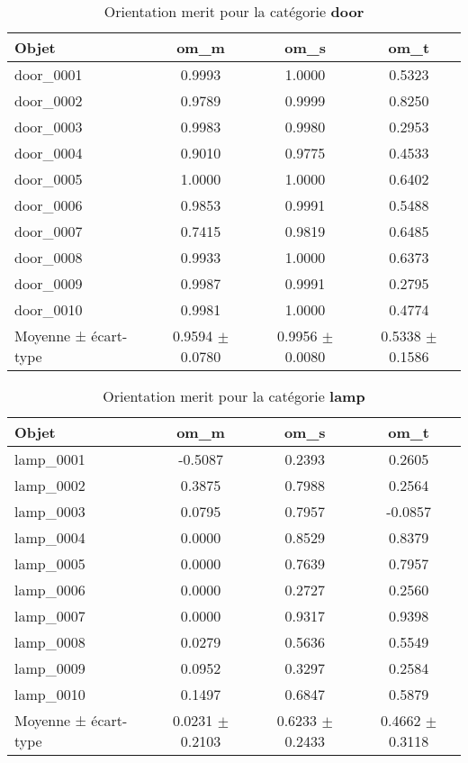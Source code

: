 \documentclass[a4paper,11pt]{article}
\begin{document}
\begin{table}[h!]
\centering
\caption{Orientation merit pour la catégorie \textbf{door}}
\begin{tabular}{lccc}
\toprule
Objet & om\_m & om\_s & om\_t \\
\midrule
door\_0001 & 0.9993 & 1.0000 & 0.5323 \\
door\_0002 & 0.9789 & 0.9999 & 0.8250 \\
door\_0003 & 0.9983 & 0.9980 & 0.2953 \\
door\_0004 & 0.9010 & 0.9775 & 0.4533 \\
door\_0005 & 1.0000 & 1.0000 & 0.6402 \\
door\_0006 & 0.9853 & 0.9991 & 0.5488 \\
door\_0007 & 0.7415 & 0.9819 & 0.6485 \\
door\_0008 & 0.9933 & 1.0000 & 0.6373 \\
door\_0009 & 0.9987 & 0.9991 & 0.2795 \\
door\_0010 & 0.9981 & 1.0000 & 0.4774 \\
\midrule
Moyenne ± écart-type & 0.9594 $\pm$ 0.0780 & 0.9956 $\pm$ 0.0080 & 0.5338 $\pm$ 0.1586 \\
\bottomrule
\end{tabular}
\end{table}

\begin{table}[h!]
\centering
\caption{Orientation merit pour la catégorie \textbf{lamp}}
\begin{tabular}{lccc}
\toprule
Objet & om\_m & om\_s & om\_t \\
\midrule
lamp\_0001 & -0.5087 & 0.2393 & 0.2605 \\
lamp\_0002 & 0.3875 & 0.7988 & 0.2564 \\
lamp\_0003 & 0.0795 & 0.7957 & -0.0857 \\
lamp\_0004 & 0.0000 & 0.8529 & 0.8379 \\
lamp\_0005 & 0.0000 & 0.7639 & 0.7957 \\
lamp\_0006 & 0.0000 & 0.2727 & 0.2560 \\
lamp\_0007 & 0.0000 & 0.9317 & 0.9398 \\
lamp\_0008 & 0.0279 & 0.5636 & 0.5549 \\
lamp\_0009 & 0.0952 & 0.3297 & 0.2584 \\
lamp\_0010 & 0.1497 & 0.6847 & 0.5879 \\
\midrule
Moyenne ± écart-type & 0.0231 $\pm$ 0.2103 & 0.6233 $\pm$ 0.2433 & 0.4662 $\pm$ 0.3118 \\
\bottomrule
\end{tabular}
\end{table}
\end{document}
